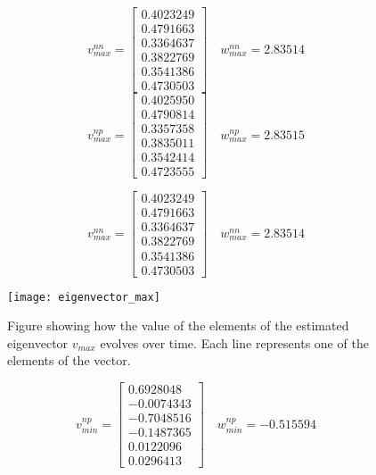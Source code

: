 \begin{equation*}
v_{max}^{nn} = \begin{bmatrix}
	0.4023249 \\
	0.4791663 \\
	0.3364637 \\
	0.3822769 \\
	0.3541386 \\
	0.4730503
\end{bmatrix} \quad w_{max}^{nn} = 2.83514
\end{equation*}\begin{equation*}
v_{max}^{np} = \begin{bmatrix}
	0.4025950 \\
	0.4790814 \\
	0.3357358 \\
    0.3835011 \\
    0.3542414 \\
    0.4723555
\end{bmatrix} \quad w_{max}^{np} =  2.83515
\end{equation*}

\begin{equation*}
v_{max}^{nn} = \begin{bmatrix}
	0.4023249 \\
	0.4791663 \\
	0.3364637 \\
	0.3822769 \\
	0.3541386 \\
	0.4730503
\end{bmatrix} \quad w_{max}^{nn} = 2.83514
\end{equation*}

\begin{figure}[htbp]
 \centering
 \texttt{[image: eigenvector\_max]}
 \caption{Figure showing how the value of the elements of the estimated eigenvector $v_{max}$ evolves over time. Each line represents one of the elements of the vector.}
 \label{fig:eigenvector_max}
\end{figure}


\begin{equation*}
  v_{min}^{np} = \begin{bmatrix}
   0.6928048 \\
  -0.0074343 \\
  -0.7048516 \\
  -0.1487365 \\
  0.0122096 \\
  0.0296413
  \end{bmatrix} \quad w_{min}^{np} = -0.515594
\end{equation*}

